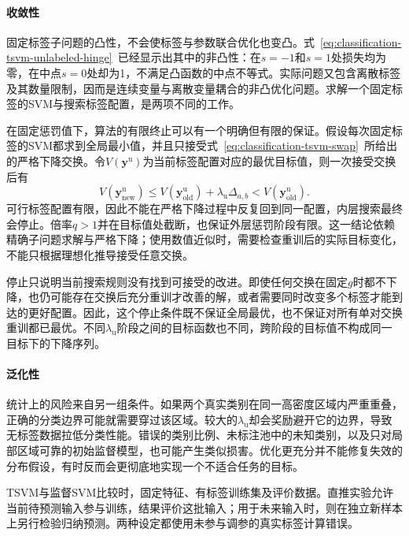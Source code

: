 \paragraph{收敛性}
固定标签子问题的凸性，不会使标签与参数联合优化也变凸。式~\eqref{eq:classification-tsvm-unlabeled-hinge}~已经显示出其中的非凸性：在$s=-1$和$s=1$处损失均为零，在中点$s=0$处却为1，不满足凸函数的中点不等式。实际问题又包含离散标签及其数量限制，因而是连续变量与离散变量耦合的非凸优化问题。求解一个固定标签的SVM与搜索标签配置，是两项不同的工作。

在固定惩罚值下，算法的有限终止可以有一个明确但有限的保证。假设每次固定标签的SVM都求到全局最小值，并且只接受式~\eqref{eq:classification-tsvm-swap}~所给出的严格下降交换。令$V(\bm{y}^{\mathrm{u}})$为当前标签配置对应的最优目标值，则一次接受交换后有
\[
  V(\bm{y}_{\mathrm{new}}^{\mathrm{u}})
    \leq V(\bm{y}_{\mathrm{old}}^{\mathrm{u}})
      +\lambda_{\mathrm{u}}\Delta_{a,b}
    <V(\bm{y}_{\mathrm{old}}^{\mathrm{u}}).
\]
可行标签配置有限，因此不能在严格下降过程中反复回到同一配置，内层搜索最终会停止。倍率$q>1$并在目标值处截断，也保证外层惩罚阶段有限。这一结论依赖精确子问题求解与严格下降；使用数值近似时，需要检查重训后的实际目标变化，不能只根据理想化推导接受任意交换。

停止只说明当前搜索规则没有找到可接受的改进。即使任何交换在固定$g$时都不下降，也仍可能存在交换后充分重训才改善的解，或者需要同时改变多个标签才能到达的更好配置。因此，这个停止条件既不保证全局最优，也不保证对所有单对交换重训都已最优。不同$\lambda_{\mathrm{u}}$阶段之间的目标函数也不同，跨阶段的目标值不构成同一目标下的下降序列。

\paragraph{泛化性}
统计上的风险来自另一组条件。如果两个真实类别在同一高密度区域内严重重叠，正确的分类边界可能就需要穿过该区域。较大的$\lambda_{\mathrm{u}}$却会奖励避开它的边界，导致无标签数据拉低分类性能。错误的类别比例、未标注池中的未知类别，以及只对局部区域可靠的初始监督模型，也可能产生类似损害。优化更充分并不能修复失效的分布假设，有时反而会更彻底地实现一个不适合任务的目标。

TSVM与监督SVM比较时，固定特征、有标签训练集及评价数据。直推实验允许当前待预测输入参与训练，结果评价这批输入；用于未来输入时，则在独立新样本上另行检验归纳预测。两种设定都使用未参与调参的真实标签计算错误。

